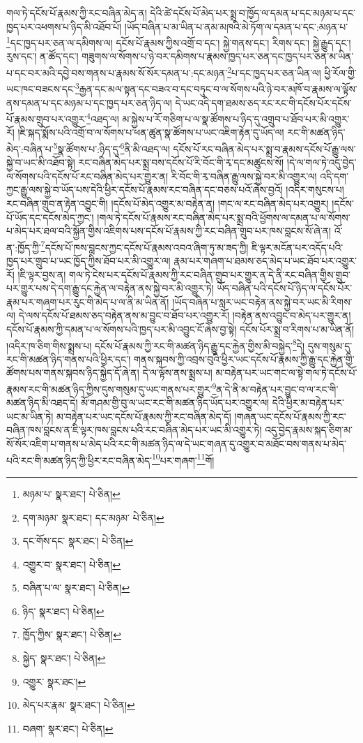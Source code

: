 གལ་ཏེ་དངོས་པོ་རྣམས་ཀྱི་རང་བཞིན་མེད་ན། དེའི་ཚེ་དངོས་པོ་མེད་པར་སྨྲ་བ་ཁྱོད་ལ་དམན་པ་དང་མཉམ་པ་དང་ཁྱད་པར་འཕགས་པ་ཉིད་མི་འཐོབ་པོ། །ཡོད་བཞིན་པ་མ་ཡིན་པ་ནམ་མཁའི་མེ་ཏོག་ལ་དམན་པ་དང་:མཉན་པ་\footnote{མཉམ་པ་  སྣར་ཐང་།  པེ་ཅིན། }དང་ཁྱད་པར་ཅན་ལ་དམིགས་ལ། དངོས་པོ་རྣམས་ཀྱིས་འགྲོ་བ་དང་། སྐྱེ་གནས་དང་། རིགས་དང་། སྐྱེ་རྒྱུད་དང་། རུས་དང་། ན་ཚོད་དང་། གཟུགས་ལ་སོགས་པ་ཉེ་བར་དམིགས་པ་རྣམས་ཁྱད་པར་ཅན་དང་ཁྱད་པར་ཅན་མ་ཡིན་པ་དང་བར་མའི་དབྱེ་བས་གནས་པ་རྣམས་སོ་སོར་དམན་པ་:དང་མཉན་\footnote{དག་མཉམ་  སྣར་ཐང་། དང་མཉམ་  པེ་ཅིན། }པ་དང་ཁྱད་པར་ཅན་ཡིན་ལ། ཕྱི་རོལ་གྱི་ཡང་ཁང་བཟངས་དང་\footnote{དང་གོས་དང་  སྣར་ཐང་།  པེ་ཅིན། }རྒྱན་དང་མལ་སྟན་དང་བཟའ་བ་དང་བཏུང་བ་ལ་སོགས་པའི་ཉེ་བར་མཁོ་བ་རྣམས་ལ་ལྟོས་ནས་དམན་པ་དང་མཉམ་པ་དང་ཁྱད་པར་ཅན་ཉིད་ལ། དེ་ཡང་འདི་དག་ཐམས་ཅད་རང་རང་གི་དངོས་པོར་དངོས་པོ་རྣམས་གྲུབ་པར་འགྱུར་\footnote{འགྱུར་བ་  སྣར་ཐང་།  པེ་ཅིན། }འཐད་ལ། མ་སྐྱེས་པ་རོ་གཅིག་པ་ལ་སྣ་ཚོགས་པ་ཉིད་དུ་འགྲུབ་པ་ཐོབ་པར་མི་འགྱུར་རོ། །ཇི་སྐད་སྨོས་པའི་འགྲོ་བ་ལ་སོགས་པ་ཕན་ཚུན་སྣ་ཚོགས་པ་ཡང་འཇིག་རྟེན་དུ་ཡོད་ལ། རང་གི་མཚན་ཉིད་མེད་:བཞིན་པ་\footnote{བཞིན་པ་ལ་  སྣར་ཐང་།  པེ་ཅིན། }སྣ་ཚོགས་པ་:ཉིད་དུ་\footnote{ཉིད་  སྣར་ཐང་།  པེ་ཅིན། }ནི་མི་འཐད་ལ། དངོས་པོ་རང་བཞིན་མེད་པར་སྨྲ་བ་རྣམས་དངོས་པོ་རྒྱུ་ལས་སྐྱེ་བ་ཡང་མི་འཐོབ་སྟེ། རང་བཞིན་མེད་པར་སྨྲ་བས་དངོས་པོ་རི་བོང་གི་རྭ་དང་མཚུངས་སོ། །དེ་ལ་གལ་ཏེ་འདུ་བྱེད་ལ་སོགས་པའི་དངོས་པོ་རང་བཞིན་མེད་པར་གྱུར་ན། རི་བོང་གི་རྭ་བཞིན་རྒྱུ་ལས་སྐྱེ་བར་མི་འགྱུར་ལ། འདི་དག་ཀྱང་རྒྱུ་ལས་སྐྱེ་བ་ཡོད་པས་དེའི་ཕྱིར་དངོས་པོ་རྣམས་རང་བཞིན་དང་བཅས་པའོ་ཞེས་བྱའོ། །འདིར་གསུངས་པ། རང་བཞིན་གྲུབ་ན་རྟེན་འབྱུང་གི། །དངོས་པོ་མེད་འགྱུར་མ་བརྟེན་ན། །གང་ལ་རང་བཞིན་མེད་པར་འགྱུར། །དངོས་པོ་ཡོད་དང་དངོས་མེད་ཀྱང་། །གལ་ཏེ་དངོས་པོ་རྣམས་རང་བཞིན་མེད་པར་སྨྲ་བའི་ཕྱོགས་ལ་དམན་པ་ལ་སོགས་པ་མེད་པར་ཐལ་བའི་སྐྱོན་གྱིས་འཇིགས་པས་དངོས་པོ་རྣམས་ཀྱི་རང་བཞིན་གྲུབ་པར་ཁས་བླངས་སོ་ཞེ་ན། འོ་ན་:ཁྱོད་ཀྱི་\footnote{ཁྱོད་ཀྱིས་  སྣར་ཐང་།  པེ་ཅིན། }དངོས་པོ་ཁས་བླངས་ཀྱང་དངོས་པོ་རྣམས་འབའ་ཞིག་ཏུ་མ་ཟད་ཀྱི། ཇི་ལྟར་མངོན་པར་འདོད་པའི་ཁྱད་པར་གྲུབ་པ་ཡང་ཁྱོད་ཀྱིས་ཐོབ་པར་མི་འགྱུར་ལ། རྣམ་པར་གཞག་པ་ཐམས་ཅད་མེད་པ་ཡང་ཐོབ་པར་འགྱུར་རོ། །ཇི་ལྟར་བྱས་ན། གལ་ཏེ་ངེས་པར་དངོས་པོ་རྣམས་ཀྱི་རང་བཞིན་གྲུབ་པར་གྱུར་ན་དེ་ནི་རང་བཞིན་གྱིས་གྲུབ་པར་གྱུར་པས་དེ་དག་རྒྱུ་དང་རྐྱེན་ལ་བརྟེན་ནས་སྐྱེ་བར་མི་འགྱུར་ཏེ། ཡོད་བཞིན་པའི་དངོས་པོ་ཉིད་ལ་དངོས་པོར་རྣམ་པར་གཞག་པར་རུང་གི་མེད་པ་ལ་ནི་མ་ཡིན་ནོ། །ཡོད་བཞིན་པ་སླར་ཡང་བརྟེན་ནས་སྐྱེ་བར་ཡང་མི་རིགས་ལ། དེ་ལས་དངོས་པོ་ཐམས་ཅད་བརྟེན་ནས་མ་བྱུང་བ་ཐོབ་པར་འགྱུར་རོ། །བརྟེན་ནས་འབྱུང་བ་མེད་པར་གྱུར་ན། དངོས་པོ་རྣམས་ཀྱི་དམན་པ་ལ་སོགས་པའི་ཁྱད་པར་མི་འབྱུང་ངོ་ཞེས་བྱ་སྟེ། དངོས་པོར་སྨྲ་བ་རིགས་པ་མ་ཡིན་ནོ། །འདིར་ཁ་ཅིག་གིས་སྨྲས་པ། དངོས་པོ་རྣམས་ཀྱི་རང་གི་མཚན་ཉིད་རྒྱུ་དང་རྐྱེན་གྱིས་མི་བསྐྱེད་\footnote{སྐྱེད་  སྣར་ཐང་།  པེ་ཅིན། }དེ། དུས་གསུམ་དུ་རང་གི་མཚན་ཉིད་གནས་པའི་ཕྱིར་དང་། གནས་སྐབས་ཀྱི་འབྲས་བུའི་ཕྱིར་ཡང་དངོས་པོ་རྣམས་ཀྱི་རྒྱུ་དང་རྐྱེན་གྱི་ཚོགས་པས་གནས་སྐབས་ཉིད་སྐྱེད་དོ་ཞེ་ན། དེ་ལ་ལྟོས་ནས་སྨྲས་པ། མ་བརྟེན་པར་ཡང་གང་ལ་སྟེ་གལ་ཏེ་དངོས་པོ་རྣམས་རང་གི་མཚན་ཉིད་ཀྱིས་དུས་གསུམ་དུ་ཡང་གནས་པར་གྱུར་\footnote{འགྱུར་  སྣར་ཐང་། }ན་དེ་ནི་མ་བརྟེན་པར་བྱུང་བ་ལ་རང་གི་མཚན་ཉིད་མི་འཐད་དེ། མོ་གཤམ་གྱི་བུ་ལ་ཡང་རང་གི་མཚན་ཉིད་ཡོད་པར་འགྱུར་ལ། དེའི་ཕྱིར་མ་བརྟེན་པར་ཡང་མ་ཡིན་ཏེ། མ་བརྟེན་པར་ཡང་དངོས་པོ་རྣམས་ཀྱི་རང་བཞིན་མེད་དོ། །གཞན་ཡང་དངོས་པོ་རྣམས་ཀྱི་རང་བཞིན་ཁས་བླངས་ན་ཇི་ལྟར་ཁས་བླངས་པའི་རང་བཞིན་མེད་པར་ཡང་མི་འགྱུར་ཏེ། འདུ་བྱེད་རྣམས་སྐད་ཅིག་མ་སོ་སོར་འཇིག་པ་གནས་པ་མེད་པའི་རང་གི་མཚན་ཉིད་ལ་དེ་ཡང་གཞན་དུ་འགྱུར་བ་མཐོང་བས་གནས་པ་མེད་པའི་རང་གི་མཚན་ཉིད་ཀྱི་ཕྱིར་རང་བཞིན་མེད་\footnote{མེད་པར་རྣམ་  སྣར་ཐང་།  པེ་ཅིན། }པར་གཞག་\footnote{བཞག་  སྣར་ཐང་།  པེ་ཅིན། }གོ། 